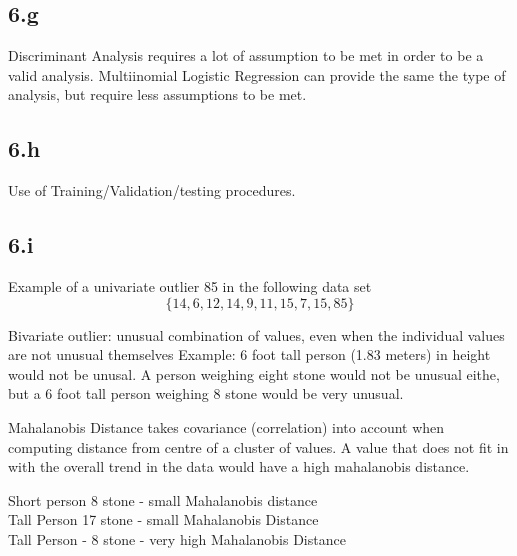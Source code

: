 \documentclass[11pt]{article} %
\begin{document}
\subsection*{6.g}

Discriminant Analysis requires a lot of assumption to be met in order to be a valid analysis.
Multiinomial Logistic Regression can provide the same the type of analysis, but require less assumptions to be met.

\subsection*{6.h}
Use of Training/Validation/testing procedures.


\subsection*{6.i}

Example of a univariate outlier 85 in the following data set
\[ \{  14,6,12,14,9,11,15,7,15,85\} \]

Bivariate outlier: unusual combination of values, even when the individual values are not unusual themselves
Example: 6 foot tall person (1.83 meters) in height would not be unusal. A person weighing eight stone would not be unusual eithe, but a 6 foot tall person weighing 8 stone would be very unusual.

Mahalanobis Distance takes covariance (correlation) into account when computing distance from centre of a cluster of values. A value that does not fit in with the overall trend in the data would have a high mahalanobis distance.

Short person 8 stone - small Mahalanobis distance\\
Tall Person 17 stone - small Mahalanobis Distance\\
Tall Person - 8 stone - very high Mahalanobis Distance\\

\end{document}

